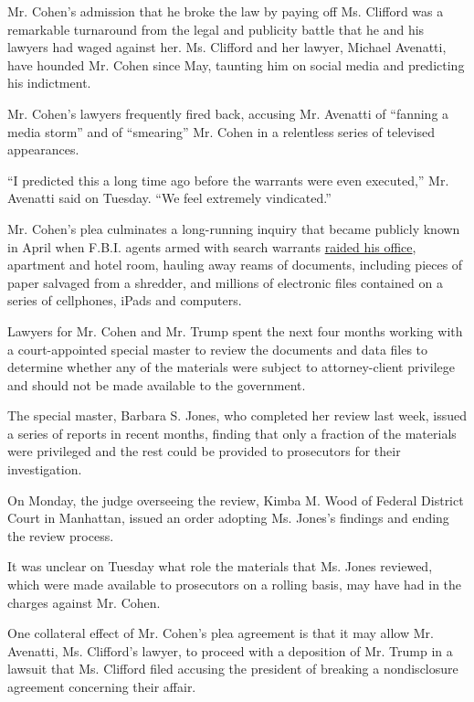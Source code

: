 Mr. Cohen's admission that he broke the law by paying off Ms. Clifford
was a remarkable turnaround from the legal and publicity battle that he
and his lawyers had waged against her. Ms. Clifford and her lawyer,
Michael Avenatti, have hounded Mr. Cohen since May, taunting him on
social media and predicting his indictment.

Mr. Cohen's lawyers frequently fired back, accusing Mr. Avenatti of
``fanning a media storm'' and of ``smearing'' Mr. Cohen in a relentless
series of televised appearances.

``I predicted this a long time ago before the warrants were even
executed,'' Mr. Avenatti said on Tuesday. ``We feel extremely
vindicated.''

Mr. Cohen's plea culminates a long-running inquiry that became publicly
known in April when F.B.I. agents armed with search warrants
\href{https://www.nytimes3xbfgragh.onion/2018/04/09/us/politics/fbi-raids-office-of-trumps-longtime-lawyer-michael-cohen.html}{raided
his office}, apartment and hotel room, hauling away reams of documents,
including pieces of paper salvaged from a shredder, and millions of
electronic files contained on a series of cellphones, iPads and
computers.

Lawyers for Mr. Cohen and Mr. Trump spent the next four months working
with a court-appointed special master to review the documents and data
files to determine whether any of the materials were subject to
attorney-client privilege and should not be made available to the
government.

The special master, Barbara S. Jones, who completed her review last
week, issued a series of reports in recent months, finding that only a
fraction of the materials were privileged and the rest could be provided
to prosecutors for their investigation.

On Monday, the judge overseeing the review, Kimba M. Wood of Federal
District Court in Manhattan, issued an order adopting Ms. Jones's
findings and ending the review process.

It was unclear on Tuesday what role the materials that Ms. Jones
reviewed, which were made available to prosecutors on a rolling basis,
may have had in the charges against Mr. Cohen.

One collateral effect of Mr. Cohen's plea agreement is that it may allow
Mr. Avenatti, Ms. Clifford's lawyer, to proceed with a deposition of Mr.
Trump in a lawsuit that Ms. Clifford filed accusing the president of
breaking a nondisclosure agreement concerning their affair.

